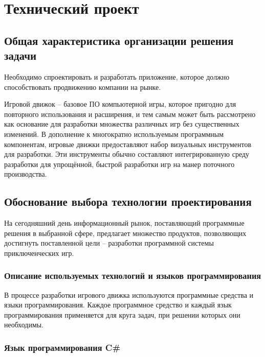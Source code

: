 \section{Технический проект}
\subsection{Общая характеристика организации решения задачи}

Необходимо спроектировать и разработать приложение, которое должно способствовать продвижению компании на рынке.

Игровой движок -- базовое ПО компьютерной игры, которое пригодно для повторного использования и расширения, и тем самым может быть рассмотрено как основание для разработки множества различных игр без существенных изменений. В дополнение к многократно используемым программным компонентам, игровые движки предоставляют набор визуальных инструментов для разработки. Эти инструменты обычно составляют интегрированную среду разработки для упрощённой, быстрой разработки игр на манер поточного производства.

\subsection{Обоснование выбора технологии проектирования}

На сегодняшний день информационный рынок, поставляющий программные решения в выбранной сфере, предлагает множество продуктов, позволяющих достигнуть поставленной цели – разработки программной системы приключенческих игр.

\subsubsection{Описание используемых технологий и языков программирования}

В процессе разработки игрового движка используются программные средства и языки программирования. Каждое программное средство и каждый язык программирования применяется для круга задач, при решении которых они необходимы.

\subsubsection{Язык программирования C\#}

